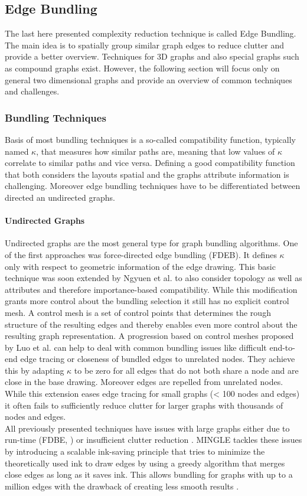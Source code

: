 \subsection{Edge Bundling}
The last here presented complexity reduction technique is called Edge Bundling. The main idea is to spatially group similar graph edges to reduce clutter and provide a better overview. Techniques for 3D graphs and also special graphs such as compound graphs exist. However, the following section will focus only on general two dimensional graphs and provide an overview of common techniques and challenges.

\subsubsection{Bundling Techniques}
Basis of most bundling techniques is a so-called compatibility function, typically named $\kappa$, that measures how similar paths are, meaning that low values of $\kappa$ correlate to similar paths and vice versa. Defining a good compatibility function that both considers the layouts spatial and the graphs attribute information is challenging. Moreover edge bundling techniques have to be differentiated between directed an undirected graphs\cite{Lhuillier2017}.

\paragraph*{Undirected Graphs} Undirected graphs are the most general type for graph bundling algorithms. One of the first approaches was force-directed edge bundling (FDEB). It defines $\kappa$ only with respect to geometric information of the edge drawing. This basic technique was soon extended by Ngyuen et al. to also consider topology as well as attributes and therefore importance-based compatibility\cite{Nguyen2012}. While this modification grants more control about the bundling selection it still has no explicit control mesh. A control mesh is a set of control points that determines the rough structure of the resulting edges and thereby enables even more control about the resulting graph representation. A progression based on control meshes proposed by Luo et al. can help to deal with common bundling issues like difficult end-to-end edge tracing or closeness of bundled edges to unrelated nodes. They achieve this by adapting $\kappa$ to be zero for all edges that do not both share a node and are close in the base drawing. Moreover edges are repelled from unrelated nodes\cite{Luo2012}. While this extension eases edge tracing for small graphs (< 100 nodes and edges) it often fails to sufficiently reduce clutter for larger graphs with thousands of nodes and edges.\\
All previously presented techniques have issues with large graphs either due to run-time (FDBE, \cite{Nguyen2012}) or insufficient clutter reduction \cite{Luo2012}. MINGLE \cite{Gansner2011} tackles these issues by introducing a scalable ink-saving principle that tries to minimize the theoretically used ink to draw edges by using a greedy algorithm that merges close edges as long as it saves ink. This allows bundling for graphs with up to a million edges with the drawback of creating less smooth results \cite{Lhuillier2017}. 

